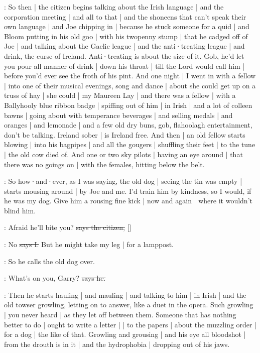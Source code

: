 \Nq:
So then |
the citizen begins talking about the Irish language |
and the corporation meeting |
and all to that |
and the shoneens that can't speak their own language |
and Joe chipping in |
because he stuck someone for a quid |
and Bloom putting in his old goo |
with his twopenny stump |
that he cadged off of Joe |
and talking about the Gaelic league |
and the anti·treating league |
and drink,
the curse of Ireland.
Anti·treating is about the size of it.
Gob,
he'd let you pour all manner of drink |
down his throat |
till the Lord would call him |
before you'd ever see the froth of his pint.
And one night |
I went in with a fellow |
into one of their musical evenings,
song and dance |
about she could get up on a truss of hay |
she could |
my Maureen Lay |
and there was a fellow |
with a Ballyhooly blue ribbon badge |
spiffing out of him |
in Irish |
and a lot of colleen bawns |
going about with temperance beverages |
and selling medals |
and oranges |
and lemonade |
and a few old dry buns,
gob,
flahoolagh entertainment,
don't be talking.
Ireland sober |
is Ireland free.
And then |
an old fellow starts blowing |
into his bagpipes |
and all the gougers |
shuffling their feet |
to the tune |
the old cow died of.
And one or two sky pilots |
having an eye around |
that there was no goings on |
with the females,
hitting below the belt.

\Nq:
So how·and·ever,
as I was saying,
the old dog |
seeing the tin was empty |
starts mousing around |
by Joe and me.
I'd train him by kindness,
so I would,
if he was my dog.
Give him a rousing fine kick |
now and again |
where it wouldn't blind him.%

\citizen:
Afraid he'll bite you?
\sout{says the citizen,}
[]

:
No
\sout{says I.}
But he might take my leg |
for a lamppost.

\Nq:
So he calls the old dog over.

\citizen:
What's on you,
Garry?
\sout{says he.}

\Nq:
Then he starts hauling |
and mauling |
and talking to him |
in Irish |
and the old towser growling,
letting on to answer,
like a duet in the opera.
Such growling |
you never heard |
as they let off between them.
Someone that has nothing better to do |
ought to write a letter |
 |
to the papers |
about the muzzling order |
for a dog |
the like of that.
Growling and grousing |
and his eye all bloodshot |
from the drouth is in it |
and the hydrophobia |
dropping out of his jaws.

